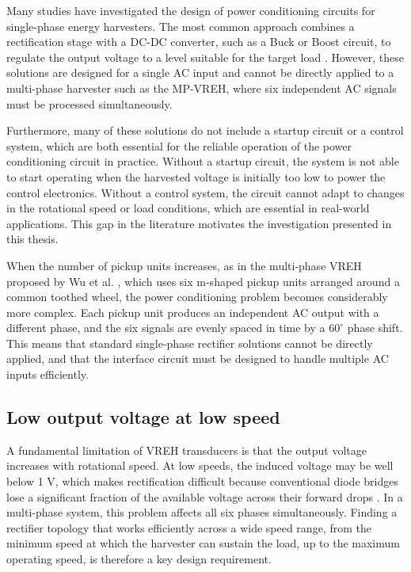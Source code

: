 Many studies have investigated the design of power 
conditioning circuits for single-phase
energy harvesters. The most common approach combines 
a rectification stage with a DC-DC converter, such as a 
Buck or Boost circuit, to regulate the output voltage to 
a level suitable for the target load \cite{yuSingleStageAC2016,yuDiscontinuousConductionMode2017a,hsiehSimpleBidirectionalBridgeless2014,dayalNewSingleStage2010}. However, these 
solutions are designed for a single AC input and cannot 
be directly applied to a multi-phase harvester such as 
the MP-VREH, where six independent AC signals must 
be processed simultaneously.

Furthermore, many of these solutions do not include a
startup circuit or a control system, which are both
essential for the reliable operation of the power
conditioning circuit in practice. Without a startup
circuit, the system is not able to start operating when
the harvested voltage is initially too low to power the
control electronics. Without a control system, the
circuit cannot adapt to changes in the rotational speed
or load conditions, which are essential in real-world
applications.
This gap in the literature 
motivates the investigation presented in this thesis.

When the number of pickup units increases,
as in the multi-phase VREH proposed by Wu et
al. \cite{wuMultiPhaseVariableReluctance2024}, which uses six m-shaped
pickup units arranged around a common toothed wheel,
the power conditioning problem becomes considerably
more complex. Each pickup unit produces an independent
AC output with a different phase, and the six signals are evenly
spaced in time by a $60^\circ$ phase shift.
This means that standard single-phase rectifier
solutions cannot be directly applied, and that the
interface circuit must be designed to handle multiple AC inputs efficiently.

\subsection*{Low output voltage at low speed}
A fundamental limitation of VREH transducers is that
the output voltage increases with rotational speed. At low
speeds, the induced voltage may be well below 1 V, which
makes rectification difficult because conventional diode
bridges lose a significant fraction of the available voltage
across their forward drops \cite{xuSystemImplementationTradeOffs2021}.
In a multi-phase system, this problem affects all six
phases simultaneously. Finding a rectifier topology that
works efficiently across a wide speed range, from the
minimum speed at which the harvester can sustain the
load, up to the maximum operating speed, is therefore
a key design requirement.

